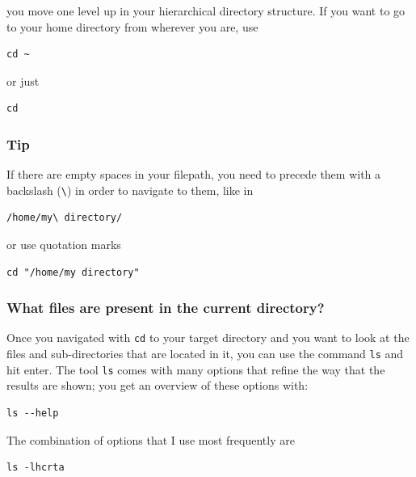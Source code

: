 \documentclass[11pt]{article}
\begin{document}
you move one level up in your hierarchical directory structure.  If
you want to go to your home directory from wherever you are, use

\begin{verbatim}
cd ~
\end{verbatim}

or just

\begin{verbatim}
cd
\end{verbatim}

\subsubsection{Tip}
\label{sec-2-1-3}
If there are empty spaces in your filepath, you need to precede them
with a backslash (\texttt{\textbackslash{}}) in order to navigate to them, like in 

\begin{verbatim}
/home/my\ directory/
\end{verbatim}

or use quotation marks

\begin{verbatim}
cd "/home/my directory"
\end{verbatim}

\subsubsection{What files are present in the current directory?}
\label{sec-2-1-4}
Once you navigated with \texttt{cd} to your target directory and you want to
look at the files and sub-directories that are located in it, you can
use the command \texttt{ls} and hit enter. The tool \texttt{ls} comes with many
options that refine the way that the results are shown; you get an
overview of these options with:

\begin{verbatim}
ls --help
\end{verbatim}

The combination of options that I use most frequently are

\begin{verbatim}
ls -lhcrta
\end{verbatim}
\end{document}
